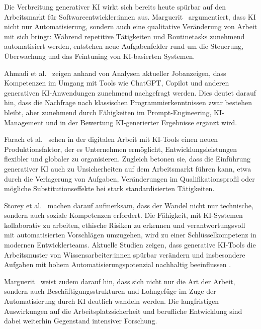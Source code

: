 Die Verbreitung generativer KI wirkt sich bereits heute spürbar auf den
Arbeitsmarkt für Softwareentwickler:innen aus.
Marguerit~\cite{marguerit_augmenting_2025} argumentiert, dass KI nicht nur
Automatisierung, sondern auch eine qualitative Veränderung von Arbeit mit sich
bringt: Während repetitive Tätigkeiten und Routinetasks zunehmend automatisiert
werden, entstehen neue Aufgabenfelder rund um die Steuerung, Überwachung und
das Feintuning von KI-basierten Systemen.

Ahmadi et al.~\cite{ahmadi_generative_2024} zeigen anhand von Analysen
aktueller Jobanzeigen, dass Kompetenzen im Umgang mit Tools wie ChatGPT,
Copilot und anderen generativen KI-Anwendungen zunehmend nachgefragt werden.
Dies deutet darauf hin, dass die Nachfrage nach klassischen
Programmierkenntnissen zwar bestehen bleibt, aber zunehmend durch Fähigkeiten
im Prompt-Engineering, KI-Management und in der Bewertung KI-generierter
Ergebnisse ergänzt wird.

Farach et al.~\cite{farach_evolving_2025} sehen in der digitalen Arbeit mit
KI-Tools einen neuen Produktionsfaktor, der es Unternehmen ermöglicht,
Entwicklungsleistungen flexibler und globaler zu organisieren. Zugleich betonen
sie, dass die Einführung generativer KI auch zu Unsicherheiten auf dem
Arbeitsmarkt führen kann, etwa durch die Verlagerung von Aufgaben,
Veränderungen im Qualifikationsprofil oder mögliche Substitutionseffekte bei
stark standardisierten Tätigkeiten.

Storey et al.~\cite{storey_generative_2025} machen darauf aufmerksam, dass der
Wandel nicht nur technische, sondern auch soziale Kompetenzen erfordert. Die
Fähigkeit, mit KI-Systemen kollaborativ zu arbeiten, ethische Risiken zu
erkennen und verantwortungsvoll mit automatisierten Vorschlägen umzugehen, wird
zu einer Schlüsselkompetenz in modernen Entwicklerteams. Aktuelle Studien
zeigen, dass generative KI-Tools die Arbeitsmuster von Wissensarbeiter:innen
spürbar verändern und insbesondere Aufgaben mit hohem Automatisierungspotenzial
nachhaltig beeinflussen \cite{dillon_shifting_2025}.

Marguerit~\cite{marguerit_augmenting_2025} weist zudem darauf hin, dass sich
nicht nur die Art der Arbeit, sondern auch Beschäftigungsstrukturen und
Lohngefüge im Zuge der Automatisierung durch KI deutlich wandeln werden. Die
langfristigen Auswirkungen auf die Arbeitsplatzsicherheit und berufliche
Entwicklung sind dabei weiterhin Gegenstand intensiver Forschung.

